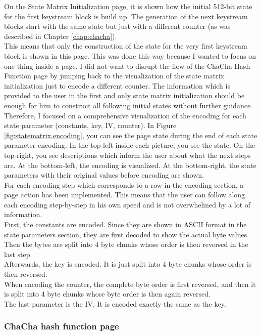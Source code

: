 On the State Matrix Initialization page, it is shown how the initial 512-bit state for the first keystream block is build up. The generation of the next keystream blocks start with the same state but just with a different counter (as was described in Chapter \ref{chap:chacha}). \\
This means that only the construction of the state for the very first keystream block is shown in this page. This was done this way because I wanted to focus on one thing inside a page. I did not want to disrupt the flow of the ChaCha Hash Function page by jumping back to the visualization of the state matrix initialization just to encode a different counter. The information which is provided to the user in the first and only state matrix initialization should be enough for him to construct all following initial states without further guidance. \\
Therefore, I focused on a comprehensive visualization of the encoding for each state parameter (constants, key, IV, counter). In Figure \ref{fig:statematrix.encoding}, you can see the page state during the end of each state parameter encoding. In the top-left inside each picture, you see the state. On the top-right, you see descriptions which inform the user about what the next steps are.
At the bottom-left, the encoding is visualized. At the bottom-right, the state parameters with their original values before encoding are shown.\\
For each encoding step which corresponds to a row in the encoding section, a page action has been implemented. This means that the user can follow along each encoding step-by-step in his own speed and is not overwhelmed by a lot of information.\\
First, the constants are encoded. Since they are shown in ASCII format in the state parameters section, they are first decoded to show the actual byte values. Then the bytes are split into 4 byte chunks whose order is then reversed in the last step. \\
Afterwards, the key is encoded. It is just split into 4 byte chunks whose order is then reversed. \\
When encoding the counter, the complete byte order is first reversed, and then it is split into 4 byte chunks whose byte order is then again reversed. \\
The last parameter is the IV. It is encoded exactly the same as the key. \\

\subsubsection{ChaCha hash function page}

